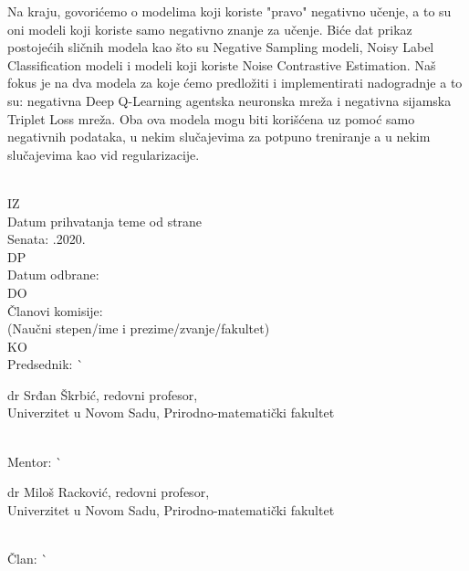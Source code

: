 \begin{tabbing}
\begin{minipage}[t]{.8\textwidth}
Na kraju, govorićemo o modelima koji koriste "pravo" negativno učenje, a to su oni modeli koji koriste samo negativno znanje za učenje. Biće dat prikaz postojećih sličnih modela kao što su Negative Sampling modeli, Noisy Label Classification modeli i modeli koji koriste Noise Contrastive Estimation. Naš fokus je na dva modela za koje ćemo predložiti i implementirati nadogradnje a to su: negativna Deep Q-Learning agentska neuronska mreža i negativna sijamska Triplet Loss mreža. Oba ova modela mogu biti korišćena uz pomoć samo negativnih podataka, u nekim slučajevima za potpuno treniranje a u nekim slučajevima kao vid regularizacije.
    \end{minipage}                                          \\
  IZ                       \>                               \\
  Datum prihvatanja teme od strane \>                       \\
  Senata:                 .2020.                     \\
  DP                       \>                               \\
  Datum odbrane:           \>                     \\
  DO                       \>                               \\
  Članovi komisije:        \>                               \\
  \hspace*{\parindent}
  (Naučni stepen/ime i prezime/zvanje/fakultet) \>          \\
  KO                       \>                               \\
  Predsednik:              \`
    \begin{minipage}[t]{.7\textwidth}
    dr Srđan Škrbić, redovni profesor,\\
    Univerzitet u Novom Sadu, Prirodno-matematički fakultet
    \end{minipage}                                          \\
  Mentor:                    \`
    \begin{minipage}[t]{.7\textwidth}
    dr Miloš Racković, redovni profesor,\\
    Univerzitet u Novom Sadu, Pri\-ro\-d\-no-ma\-te\-ma\-ti\-č\-ki fakultet
    \end{minipage}                                          \\
  Član:                    \`
    \begin{minipage}[t]{.7\textwidth}

\end{minipage}
\end{tabbing}
